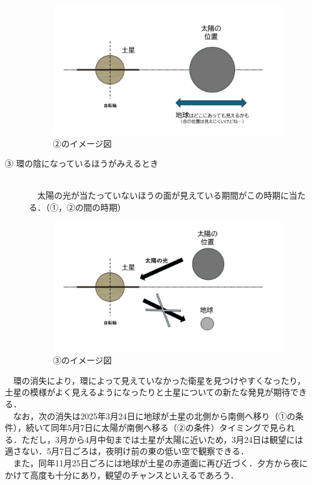 \documentclass[../main]{subfiles}
\begin{document}
\begin{description}
\begin{figure}[H]
    \centering
    \includegraphics[width=14cm]{sections/kurahara/部誌用/スライド2.JPG}
    \caption{②のイメージ図}
\end{figure}

    \item [③ 環の陰になっているほうがみえるとき]\mbox{}\\
    　太陽の光が当たっていないほうの面が見えている期間がこの時期に当たる．（①，②の間の時期）
\begin{figure}[H]
    \centering
    \includegraphics[width=14cm]{sections/kurahara/部誌用/スライド4.JPG}
    \caption{③のイメージ図}
\end{figure}
\end{description}


　環の消失により，環によって見えていなかった衛星を見つけやすくなったり，土星の模様がよく見えるようになったりと土星についての新たな発見が期待できる．\\
　なお，次の消失は2025年3月24日に地球が土星の北側から南側へ移り（①の条件），続いて同年5月7日に太陽が南側へ移る（②の条件）タイミングで見られる．ただし，3月から4月中旬までは土星が太陽に近いため，3月24日は観望には適さない．5月7日ごろは，夜明け前の東の低い空で観察できる．\\
　また，同年11月25日ごろには地球が土星の赤道面に再び近づく．夕方から夜にかけて高度も十分にあり，観望のチャンスといえるであろう．
\end{document}
